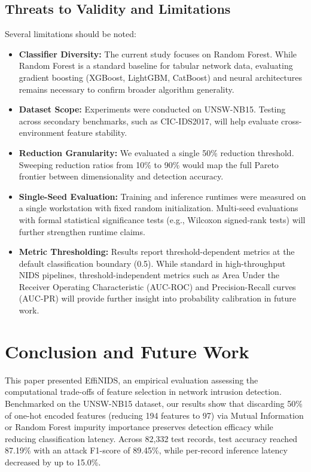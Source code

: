 \documentclass[conference]{IEEEtran}
\begin{document}
\subsection{Threats to Validity and Limitations}
Several limitations should be noted:
\begin{itemize}
    \item \textbf{Classifier Diversity:} The current study focuses on Random Forest. While Random Forest is a standard baseline for tabular network data, evaluating gradient boosting (XGBoost, LightGBM, CatBoost) and neural architectures remains necessary to confirm broader algorithm generality.
    \item \textbf{Dataset Scope:} Experiments were conducted on UNSW-NB15. Testing across secondary benchmarks, such as CIC-IDS2017, will help evaluate cross-environment feature stability.
    \item \textbf{Reduction Granularity:} We evaluated a single 50\% reduction threshold. Sweeping reduction ratios from 10\% to 90\% would map the full Pareto frontier between dimensionality and detection accuracy.
    \item \textbf{Single-Seed Evaluation:} Training and inference runtimes were measured on a single workstation with fixed random initialization. Multi-seed evaluations with formal statistical significance tests (e.g., Wilcoxon signed-rank tests) will further strengthen runtime claims.
    \item \textbf{Metric Thresholding:} Results report threshold-dependent metrics at the default classification boundary (0.5). While standard in high-throughput NIDS pipelines, threshold-independent metrics such as Area Under the Receiver Operating Characteristic (AUC-ROC) and Precision-Recall curves (AUC-PR) will provide further insight into probability calibration in future work.
\end{itemize}

\section{Conclusion and Future Work}
This paper presented EffiNIDS, an empirical evaluation assessing the computational trade-offs of feature selection in network intrusion detection. Benchmarked on the UNSW-NB15 dataset, our results show that discarding 50\% of one-hot encoded features (reducing 194 features to 97) via Mutual Information or Random Forest impurity importance preserves detection efficacy while reducing classification latency. Across 82,332 test records, test accuracy reached 87.19\% with an attack F1-score of 89.45\%, while per-record inference latency decreased by up to 15.0\%.
\end{document}
